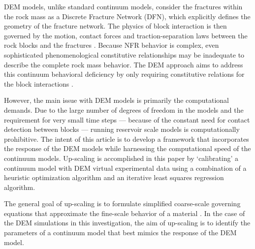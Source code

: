 DEM models, unlike standard continuum models, consider the fractures within the rock mass as a Discrete Fracture Network (DFN), which explicitly defines the geometry of the fracture network. The physics of block interaction is then governed by the motion, contact forces and traction-separation laws between the rock blocks and the fractures \citep{Cundall_1979}. Because NFR behavior is complex, even sophisticated phenomenological constitutive relationships may be inadequate to describe the complete rock mass behavior. The DEM approach aims to address this continuum behavioral deficiency by only requiring constitutive relations for the block interactions \citep{Cundall_2001}.

However, the main issue with DEM models is primarily the computational demands. Due to the large number of degrees of freedom in the models and the requirement for very small time steps — because of the constant need for contact detection between blocks — running reservoir scale models is computationally prohibitive. The intent of this article is to develop a framework that incorporates the response of the DEM models while harnessing the computational speed of the continuum models. Up-scaling is accomplished in this paper by ‘calibrating’ a continuum model with DEM virtual experimental data using a combination of a heuristic optimization algorithm and an iterative least squares regression algorithm.

The general goal of up-scaling is to formulate simplified coarse-scale governing equations that approximate the fine-scale behavior of a material \citep{Geers_2010}. In the case of the DEM simulations in this investigation, the aim of up-scaling is to identify the parameters of a continuum model that best mimics the response of the DEM model.

